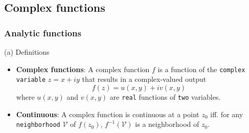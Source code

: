 \subsection{Complex functions}

\subsubsection{Analytic functions}
(a) Definitions
\begin{itemize}
	\item \textbf{Complex functions}: A complex function $f$ is a function of the \verb|complex variable| $z=x+iy$ that results in a complex-valued output
	$$
	f(z) = u(x,y) + iv(x,y)
	$$
	where $u(x,y)$ and $v(x,y) $ are \verb|real| functions of \verb|two| variables.
	\item \textbf{Continuous}: A complex function is continuous at a point $z_0$ iff. for any \verb|neighborhood| $\mathcal{V}$ of $f(z_0)$, $f^{-1}(\mathcal{V})$ is a neighborhood of $z_0$. 
\end{itemize}